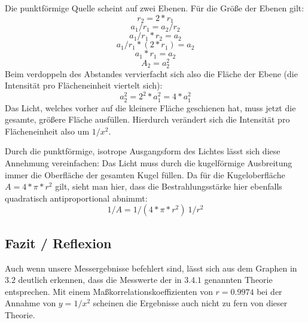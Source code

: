 \documentclass[12pt, a4paper]{article}
\begin{document}
Die punktförmige Quelle scheint auf zwei Ebenen. Für die Größe der Ebenen gilt:
$$r_2=2*r_1$$
$$a_1 / r_1 = a_2 / r_2$$
$$a_1 / r_1 * r_2 = a_2$$
$$a_1 / r_1 * (2 * r_1) = a_2$$
$$a_1 * r_1 = a_2$$
$$A_2 = a_2^2$$
Beim verdoppeln des Abstandes vervierfacht sich also die Fläche der Ebene (die Intensität pro Flächeneinheit viertelt sich):
$$a_2^2=2^2 * a_1^2 = 4 * a_1^2$$
Das Licht, welches vorher auf die kleinere Fläche geschienen hat, muss jetzt die gesamte, größere Fläche ausfüllen. Hierdurch verändert sich die Intensität pro Flächeneinheit also um $1/x^2$.

Durch die punktförmige, isotrope Ausgangsform des Lichtes lässt sich diese Annehmung vereinfachen:
Das Licht muss durch die kugelförmige Ausbreitung immer die Oberfläche der gesamten Kugel füllen. Da für die Kugeloberfläche $A=4*\pi*r^2$ gilt, sieht man hier, dass die Bestrahlungsstärke hier ebenfalls quadratisch antiproportional abnimmt:
$$1/A = 1/(4 * \pi * r^2) ~ 1/r^2$$

\subsection{Fazit / Reflexion}
Auch wenn unsere Messergebnisse befehlert sind, lässt sich aus dem Graphen in $3.2$ deutlich erkennen, dass die Messwerte der in $3.4.1$ genannten Theorie entsprechen.
Mit einem Maßkorrelationskoeffizienten von $r = 0.9974$ bei der Annahme von $y=1/x^2$ scheinen die Ergebnisse auch nicht zu fern von dieser Theorie.
\end{document}
